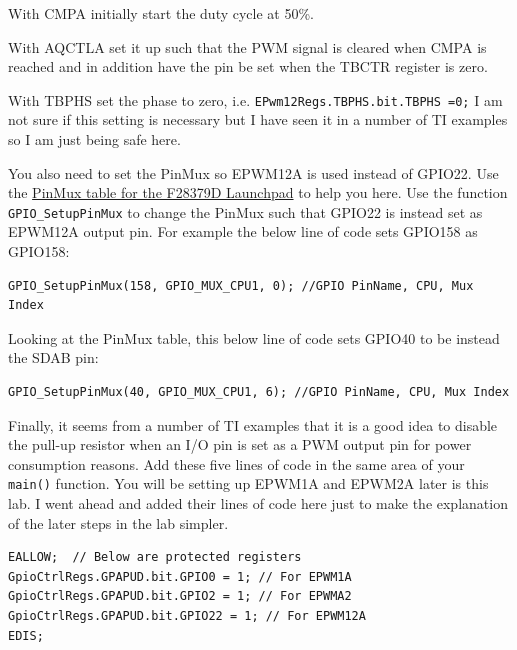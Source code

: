 \documentclass[11pt]{article}
\begin{document}
With CMPA initially start the duty cycle at 50\%.

With AQCTLA set it up such that the PWM signal is cleared when CMPA is reached and in addition have the pin be set when the TBCTR register is zero.

With TBPHS set the phase to zero, i.e. \texttt{EPwm12Regs.TBPHS.bit.TBPHS =0;} I am not sure if this setting is necessary but I have seen it in a number of TI examples so I am just being safe here.

You also need to set the PinMux so EPWM12A is used instead of GPIO22. Use the \href{http://coecsl.ece.illinois.edu/SE423/Lab_PinMuxTableF28379DLaunchPadSE423Robot.pdf}{PinMux table for the F28379D Launchpad} to help you here. Use the function \texttt{GPIO_SetupPinMux} to change the PinMux such that GPIO22 is instead set as EPWM12A output pin. For example the below line of code sets GPIO158 as GPIO158:
%
\begin{verbatim}
GPIO_SetupPinMux(158, GPIO_MUX_CPU1, 0); //GPIO PinName, CPU, Mux Index
\end{verbatim}
%
Looking at the PinMux table, this below line of code sets GPIO40 to be instead the SDAB pin:
%
\begin{verbatim}
GPIO_SetupPinMux(40, GPIO_MUX_CPU1, 6); //GPIO PinName, CPU, Mux Index
\end{verbatim}
%
Finally, it seems from a number of TI examples that it is a good idea to disable the pull-up resistor when an I/O pin is set as a PWM output pin for power consumption reasons. Add these five lines of code in the same area of your \texttt{main()} function. You will be setting up EPWM1A and EPWM2A later is this lab. I went ahead and added their lines of code here just to make the explanation of the later steps in the lab simpler.
%
\begin{verbatim}
EALLOW;  // Below are protected registers
GpioCtrlRegs.GPAPUD.bit.GPIO0 = 1; // For EPWM1A
GpioCtrlRegs.GPAPUD.bit.GPIO2 = 1; // For EPWMA2
GpioCtrlRegs.GPAPUD.bit.GPIO22 = 1; // For EPWM12A
EDIS;
\end{verbatim}
%
\end{document}
